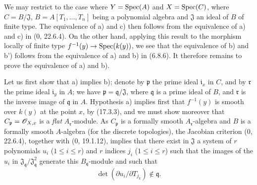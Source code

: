 We may restrict to the case where $Y=\operatorname{Spec}(A)$ and $X=\operatorname{Spec}(C)$, where $C=B/\mathfrak{J}$, $B=A[T_1,\ldots,T_n]$ being a polynomial algebra and $\mathfrak{J}$ an ideal of $B$ of finite type. The equivalence of a) and c) then follows from the equivalence of a) and c) in (0, 22.6.4). On the other hand, applying this result to the morphism locally of finite type $f^{-1}(y)\to\operatorname{Spec}(k(y))$, we see that the equivalence of b) and b') follows from the equivalence of a) and b) in (6.8.6). It therefore remains to prove the equivalence of a) and b).

Let us first show that a) implies b); denote by $\mathfrak p$ the prime ideal $\mathfrak i_x$ in $C$, and by $\mathfrak r$ the prime ideal $\mathfrak i_y$ in $A$; we have $\mathfrak p=\mathfrak q/\mathfrak J$, where $\mathfrak q$ is a prime ideal of $B$, and $\mathfrak r$ is the inverse image of $\mathfrak q$ in $A$. Hypothesis a) implies first that $f^{-1}(y)$ is smooth over $k(y)$ at the point $x$, by (17.3.3), and we must show moreover that $C_{\mathfrak p}=\mathscr{O}_{X,x}$ is a \emph{flat} $A_{\mathfrak r}$-module. As $C_{\mathfrak p}$ is a formally smooth $A_{\mathfrak r}$-algebra and $B$ is a formally smooth $A$-algebra (for the discrete topologies), the Jacobian criterion (0, 22.6.4), together with (0, 19.1.12), implies that there exist in $\mathfrak J$ a system of $r$ polynomials $u_i$ ($1\leq i\leq r$) and $r$ indices $j_i$ ($1\leq i\leq r$) such that the images of the $u_i$ in $\mathfrak J_{\mathfrak q}/\mathfrak J_{\mathfrak q}^2$ generate this $B_{\mathfrak q}$-module and such that
\[
\label{IV.17.5.1.1}
\det(\partial u_i/\partial T_{j_k})\notin\mathfrak q.
\tag{17.5.1.1}
\]

